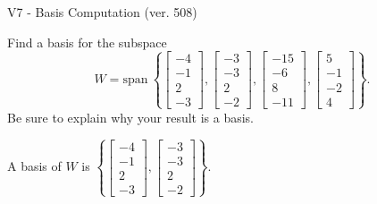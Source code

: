 \begin{exercise}
  \begin{exerciseTitle}V7 - Basis Computation (ver. 508)\end{exerciseTitle}
  \begin{exerciseStatement}
    Find a basis for the subspace 
\[W=\mathrm{span}\ \left\{\left[\begin{array}{r}
-4 \\
-1 \\
2 \\
-3
\end{array}\right] , \left[\begin{array}{r}
-3 \\
-3 \\
2 \\
-2
\end{array}\right] , \left[\begin{array}{r}
-15 \\
-6 \\
8 \\
-11
\end{array}\right] , \left[\begin{array}{r}
5 \\
-1 \\
-2 \\
4
\end{array}\right]\right\}.\]
 Be sure to explain why your result is a basis.


  \end{exerciseStatement}
  \begin{exerciseAnswer}
   A basis of \(W\) is  \(\left\{\left[\begin{array}{r}
-4 \\
-1 \\
2 \\
-3
\end{array}\right] , \left[\begin{array}{r}
-3 \\
-3 \\
2 \\
-2
\end{array}\right]\right\}\).
  


  \end{exerciseAnswer}
\end{exercise}